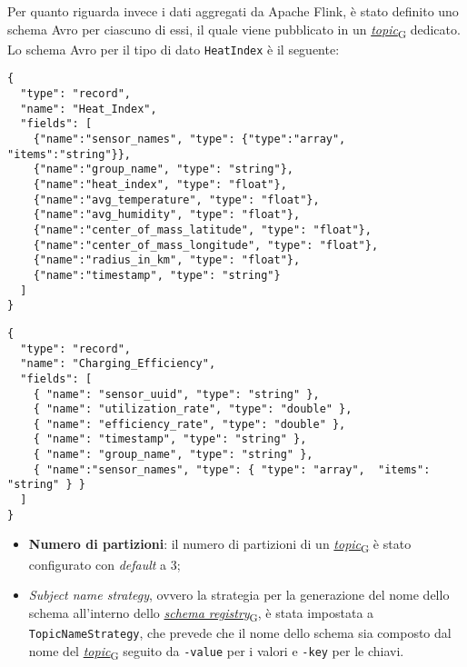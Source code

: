Per quanto riguarda invece i dati aggregati da Apache Flink, è stato definito uno schema Avro per ciascuno di essi, il quale viene pubblicato in un \href{https://7last.github.io/docs/pb/documentazione-interna/glossario\#topic}{\textit{topic}\textsubscript{G}} dedicato.
Lo schema Avro per il tipo di dato \texttt{HeatIndex} è il seguente:
\begin{lstlisting}[language=\href{https://7last.github.io/docs/pb/documentazione-interna/glossario\#javascript-object-notation}{json\textsubscript{G}}, caption=Schema Avro per il tipo di dato \texttt{HeatIndex},captionpos=b]
{
  "type": "record",
  "name": "Heat_Index",
  "fields": [
    {"name":"sensor_names", "type": {"type":"array", "items":"string"}},
    {"name":"group_name", "type": "string"},
    {"name":"heat_index", "type": "float"},
    {"name":"avg_temperature", "type": "float"},
    {"name":"avg_humidity", "type": "float"},
    {"name":"center_of_mass_latitude", "type": "float"},
    {"name":"center_of_mass_longitude", "type": "float"},
    {"name":"radius_in_km", "type": "float"},
    {"name":"timestamp", "type": "string"}
  ]
}

\end{lstlisting}

\begin{lstlisting}[language=\href{https://7last.github.io/docs/pb/documentazione-interna/glossario\#javascript-object-notation}{json\textsubscript{G}}, caption=Schema Avro per il tipo di dato \texttt{ChargingEfficiency},captionpos=b]
{
  "type": "record",
  "name": "Charging_Efficiency",
  "fields": [
    { "name": "sensor_uuid", "type": "string" },
    { "name": "utilization_rate", "type": "double" },
    { "name": "efficiency_rate", "type": "double" },
    { "name": "timestamp", "type": "string" },
    { "name": "group_name", "type": "string" },
    { "name":"sensor_names", "type": { "type": "array",  "items": "string" } }
  ]
}

\end{lstlisting}

\begin{itemize}
	\item \textbf{Numero di partizioni}: il numero di partizioni di un \href{https://7last.github.io/docs/pb/documentazione-interna/glossario\#topic}{\textit{topic}\textsubscript{G}} è stato configurato con \textit{default} a 3;
	\item \textit{Subject name strategy}, ovvero la strategia per la generazione del nome dello schema all'interno dello \href{https://7last.github.io/docs/pb/documentazione-interna/glossario\#schema-registry}{\textit{schema registry}\textsubscript{G}}, è stata impostata a \texttt{TopicNameStrategy},
	      che prevede che il nome dello schema sia composto dal nome del \href{https://7last.github.io/docs/pb/documentazione-interna/glossario\#topic}{\textit{topic}\textsubscript{G}} seguito da \texttt{-value} per i valori e \texttt{-key} per le chiavi.
\end{itemize}

